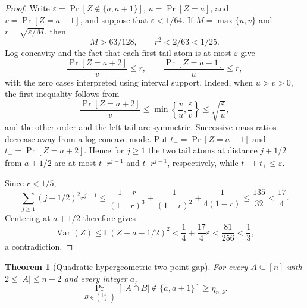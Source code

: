 \documentclass[11pt]{article}
\newtheorem{theorem}{Theorem}[section]
\theoremstyle{definition}
\theoremstyle{remark}
\newcommand{\1}{\mathbf 1}
\newcommand{\Var}{\operatorname{Var}}
\begin{document}
\begin{proof}
Write $\varepsilon=\Pr[Z\notin\{a,a+1\}]$, $u=\Pr[Z=a]$, and
$v=\Pr[Z=a+1]$, and suppose that $\varepsilon<1/64$.  If
$M=\max\{u,v\}$ and $r=\sqrt{\varepsilon/M}$, then
\[
 M>63/128,
 \qquad r^2<2/63<1/25.
\]
Log-concavity and the fact that each first tail atom is at most
$\varepsilon$ give
\[
 \frac{\Pr[Z=a+2]}v\le r,
 \qquad
 \frac{\Pr[Z=a-1]}u\le r,
\]
with the zero cases interpreted using interval support.  Indeed, when
$u>v>0$, the first inequality follows from
\[
 \frac{\Pr[Z=a+2]}v
 \le\min\left\{\frac vu,\frac\varepsilon v\right\}
 \le\sqrt{\frac\varepsilon u},
\]
and the other order and the left tail are symmetric.  Successive mass ratios
decrease away from a log-concave mode.  Put
$t_-=\Pr[Z=a-1]$ and $t_+=\Pr[Z=a+2]$.  Hence for $j\ge1$ the two tail atoms
at distance $j+1/2$ from $a+1/2$ are at most
$t_-r^{j-1}$ and $t_+r^{j-1}$, respectively, while
$t_-+t_+\le\varepsilon$.

Since $r<1/5$,
\[
 \sum_{j\ge1}(j+1/2)^2r^{j-1}
 \le\frac{1+r}{(1-r)^3}+\frac1{(1-r)^2}+\frac1{4(1-r)}
 \le\frac{135}{32}<\frac{17}{4}.
\]
Centering at $a+1/2$ therefore gives
\[
 \Var(Z)
 \le\mathbb E(Z-a-1/2)^2
 <\frac14+\frac{17}{4}\varepsilon
 <\frac{81}{256}<\frac13,
\]
a contradiction.
\end{proof}

\begin{theorem}[Quadratic hypergeometric two-point gap]
\label{thm:quadratic-hypergeometric-gap}
For every $A\subseteq[n]$ with $2\le|A|\le n-2$ and every integer $a$,
\[
 \Pr_{B\in\binom{[n]}k}[|A\cap B|\notin\{a,a+1\}]
 \ge\eta_{n,k}.
\]
\end{theorem}
\end{document}
